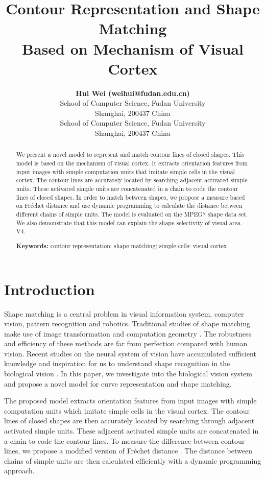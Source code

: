 \documentclass[10pt,letterpaper]{article}
\title{Contour Representation and Shape Matching \\Based on Mechanism of Visual Cortex}
\author{{\large \bf Hui Wei (weihui@fudan.edu.cn)} \\
  School of Computer Science, Fudan University \\
  Shanghai, 200437 China
  \AND {\large \bf Zheng Dong (dongzheng@fudan.edu.cn)} \\
  School of Computer Science, Fudan University \\
  Shanghai, 200437 China}
\begin{document}
\maketitle


\begin{abstract}
We present a novel model to represent and match contour lines of closed shapes.
This model is based on the mechanism of visual cortex.
It extracts orientation features from input images with simple computation units 
that imitate simple cells in the visual cortex.
The contour lines are accurately located by searching adjacent activated simple units.
These activated simple units are concatenated in a chain to code the contour lines of closed shapes.
In order to match between shapes, we propose a measure based on Fr\'echet distance
and use dynamic programming to calculate the distance between different chains of simple units.
The model is evaluated on the MPEG7 shape data set.
We also demonstrate that this model can explain the shape selectivity of visual area V4.


\textbf{Keywords:} 
contour representation; shape matching; simple cells; visual cortex
\end{abstract}


\section{Introduction}

Shape matching is a central problem in visual information system, computer vision, 
pattern recognition and robotics. 
Traditional studies of shape matching make use of image transformation and computation geometry 
\cite{veltkamp2001}.
The robustness and efficiency of these methods are far from perfection compared with human vision.
Recent studies on the neural system of vision have accumulated sufficient knowledge 
and inspiration for us to understand shape recognition in the biological vision
\cite{gustavsen2003,pasupathy2002}.
In this paper, we investigate into the biological vision system
and propose a novel model for curve representation and shape matching.

The proposed model extracts orientation features from input images 
with simple computation units which imitate simple cells in the visual cortex.
The contour lines of closed shapes are then accurately located by
searching through adjacent activated simple units.
These adjacent activated simple units are concatenated in a chain 
to code the contour lines.
To measure the difference between contour lines, we propose a modified version of Fr\'echet distance
\cite{alt2003}.
The distance between chains of simple units are then calculated efficiently 
with a dynamic programming approach.
\end{document}
